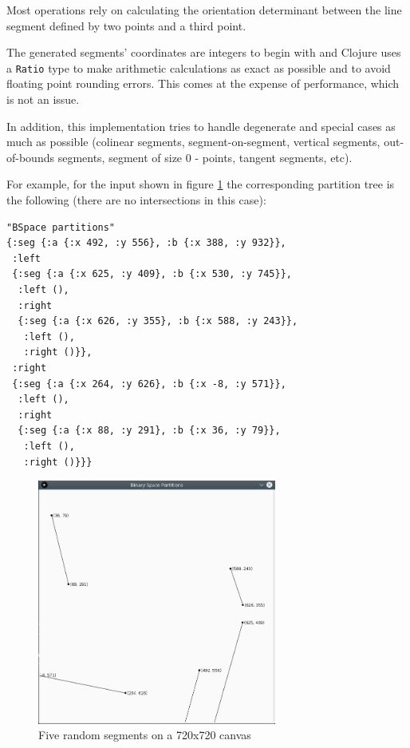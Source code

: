 \documentclass[12pt,a4paper]{article}
\begin{document}
Most operations rely on calculating the orientation determinant
between the line segment defined by two points and a third point.

The generated segments' coordinates are integers to begin with and
Clojure uses a \texttt{Ratio} type to make arithmetic calculations as
exact as possible and to avoid floating point rounding errors. This
comes at the expense of performance, which is not an issue.

In addition, this implementation tries to handle degenerate and
special cases as much as possible (colinear segments,
segment-on-segment, vertical segments, out-of-bounds segments, segment
of size 0 - points, tangent segments, etc).

For example, for the input shown in figure \ref{fig:sample-input} the
corresponding partition tree is the following (there are no
intersections in this case):

\begin{verbatim}
"BSpace partitions"
{:seg {:a {:x 492, :y 556}, :b {:x 388, :y 932}},
 :left
 {:seg {:a {:x 625, :y 409}, :b {:x 530, :y 745}},
  :left (),
  :right
  {:seg {:a {:x 626, :y 355}, :b {:x 588, :y 243}},
   :left (),
   :right ()}},
 :right
 {:seg {:a {:x 264, :y 626}, :b {:x -8, :y 571}},
  :left (),
  :right
  {:seg {:a {:x 88, :y 291}, :b {:x 36, :y 79}},
   :left (),
   :right ()}}}
\end{verbatim}

\begin{figure}[ht!]
  \centering
  \includegraphics[width=0.7\textwidth]{img/sample-input.png}
  \caption{Five random segments on a 720x720 canvas}
  \label{fig:sample-input}
\end{figure}
\end{document}
